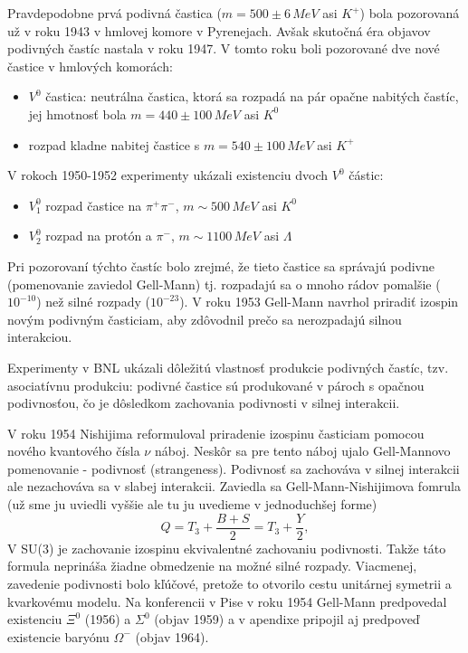 \documentclass[../../main.tex]{subfiles}
\begin{document}
Pravdepodobne prvá podivná častica ($m=500\pm 6 \,MeV$ asi $K^{+}$) bola pozorovaná už v roku 1943 v hmlovej komore v Pyrenejach. Avšak skutočná éra objavov podivných častíc nastala v roku 1947. V tomto roku boli pozorované dve nové častice v hmlových komorách:
\begin{itemize}
\item $V^{0}$ častica: neutrálna častica, ktorá sa rozpadá na pár opačne nabitých častíc, jej hmotnosť bola $m=440\pm 100 \,MeV$ asi $K^{0}$
\item rozpad kladne nabitej častice s $m=540\pm 100 \,MeV$ asi $K^{+}$
\end{itemize}
V rokoch 1950-1952 experimenty ukázali existenciu dvoch $V^{0}$ částic:
\begin{itemize}
\item $V^{0}_1$ rozpad častice na $\pi^{+}\pi^{-}$, $m \sim 500 \,MeV$ asi $K^{0}$
\item $V^{0}_2$ rozpad na protón a $\pi^{-}$, $m \sim 1100 \,MeV$ asi $\Lambda$
\end{itemize}
Pri pozorovaní týchto častíc bolo zrejmé, že tieto častice sa správajú podivne (pomenovanie zaviedol Gell-Mann) tj. rozpadajú sa o mnoho rádov pomalšie ($10^{-10}$) než silné rozpady ($10^{-23}$). V roku 1953 Gell-Mann navrhol priradiť izospin novým podivným časticiam, aby zdôvodnil prečo sa nerozpadajú silnou interakciou.

Experimenty v BNL ukázali dôležitú vlastnosť produkcie podivných častíc, tzv. asociatívnu produkciu: podivné častice sú produkované v pároch s opačnou podivnosťou, čo je dôsledkom zachovania podivnosti v silnej interakcii.

V roku 1954 Nishijima reformuloval priradenie izospinu časticiam pomocou nového kvantového čísla $\nu$ náboj. Neskôr sa pre tento náboj ujalo Gell-Mannovo pomenovanie - podivnosť (strangeness). Podivnosť sa zachováva v silnej interakcii ale nezachováva sa v slabej interakcii. Zaviedla sa Gell-Mann-Nishijimova fomrula (už sme ju uviedli vyššie ale tu ju uvedieme v jednoduchšej forme)
$$ Q = T_3 + \frac{B+S}{2} = T_3 + \frac{Y}{2},$$
V SU(3) je zachovanie izospinu ekvivalentné zachovaniu podivnosti. Takže táto formula neprináša žiadne obmedzenie na možné silné rozpady. Viacmenej, zavedenie podivnosti bolo kľúčové, pretože to otvorilo cestu unitárnej symetrii a kvarkovému modelu. 
Na konferencii v Pise v roku 1954 Gell-Mann predpovedal existenciu $\Xi^0$ (1956) a $\Sigma^0$ (objav 1959) a v apendixe pripojil aj predpoveď existencie baryónu $\Omega^-$ (objav 1964).
\end{document}
